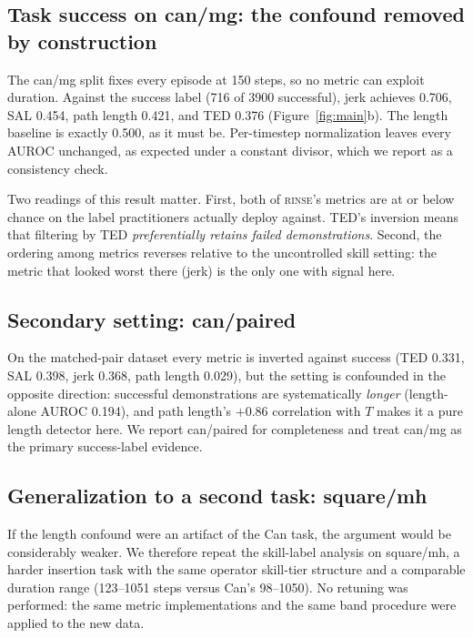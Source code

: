 \documentclass[10pt]{article}
\newcommand{\rinse}{\textsc{rinse}}
\begin{document}
\subsection{Task success on can/mg: the confound removed by construction}

The can/mg split fixes every episode at 150 steps, so no metric can exploit
duration. Against the success label (716 of 3900 successful), jerk achieves
0.706, SAL 0.454, path length 0.421, and TED 0.376
(Figure~\ref{fig:main}b). The length baseline is exactly 0.500, as it must
be. Per-timestep normalization leaves every AUROC unchanged, as expected
under a constant divisor, which we report as a consistency check.

Two readings of this result matter. First, both of \rinse{}'s metrics are at
or below chance on the label practitioners actually deploy against. TED's
inversion means that filtering by TED \emph{preferentially retains failed
demonstrations}. Second, the ordering among metrics reverses relative to the
uncontrolled skill setting: the metric that looked worst there (jerk) is the
only one with signal here.

\subsection{Secondary setting: can/paired}

On the matched-pair dataset every metric is inverted against success (TED
0.331, SAL 0.398, jerk 0.368, path length 0.029), but the setting is
confounded in the opposite direction: successful demonstrations are
systematically \emph{longer} (length-alone AUROC 0.194), and path length's
$+0.86$ correlation with $T$ makes it a pure length detector here. We
report can/paired for completeness and treat can/mg as the primary
success-label evidence.

\subsection{Generalization to a second task: square/mh}
\label{sec:square}

If the length confound were an artifact of the Can task, the argument would
be considerably weaker. We therefore repeat the skill-label analysis on
square/mh, a harder insertion task with the same operator skill-tier
structure and a comparable duration range (123--1051 steps versus Can's
98--1050). No retuning was performed: the same metric implementations and
the same band procedure were applied to the new data.
\end{document}
